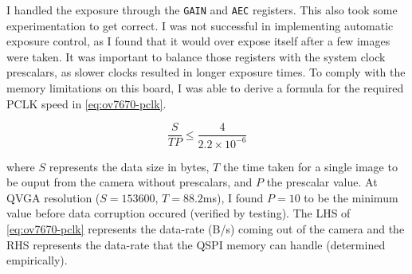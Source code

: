 I handled the exposure through the \verb|GAIN| and \verb|AEC| registers. This also took some experimentation to get correct. I was not successful in implementing automatic exposure control, as I found that it would over expose itself after a few images were taken. It was important to balance those registers with the system clock prescalars, as slower clocks resulted in longer exposure times.
\nl
To comply with the memory limitations on this board, I was able to derive a formula for the required PCLK speed in \autoref{eq:ov7670-pclk}.

\begin{equation}
    \frac{S}{TP} \leq \frac{4}{2.2\times10^{-6}}
    \label{eq:ov7670-pclk}
\end{equation}

where $S$ represents the data size in bytes, $T$ the time taken for a single image to be ouput from the camera without prescalars, and $P$ the prescalar value. At QVGA resolution ($S=153600$, $T=88.2$ms), I found $P=10$ to be the minimum value before data corruption occured (verified by testing). The LHS of \autoref{eq:ov7670-pclk} represents the data-rate (B/s) coming out of the camera and the RHS represents the data-rate that the QSPI memory can handle (determined empirically).